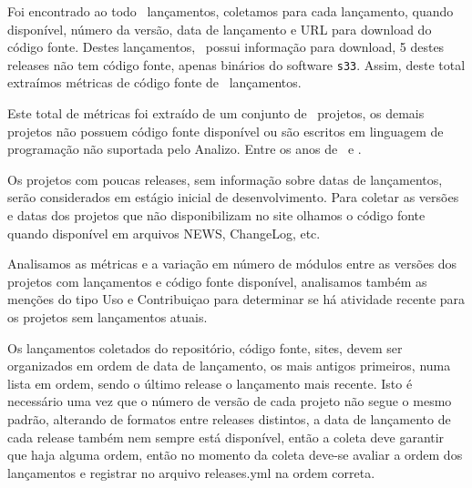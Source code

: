 Foi encontrado ao todo \ReleasesCount \ lançamentos, coletamos para cada
lançamento, quando disponível, número da versão, data de lançamento e URL para
download do código fonte. Destes lançamentos, \ReleasesAvailableCount \ possui
informação para download, 5 destes releases não tem código fonte, apenas
binários do software \texttt{s33}. Assim, deste total extraímos métricas
de código fonte de \ReleasesMetricsCount \ lançamentos.

Este total de métricas foi extraído de um conjunto de \ProjectsAnalizedCount \
projetos, os demais projetos não possuem código fonte disponível ou são
escritos em linguagem de programação não suportada pelo Analizo. Entre os anos
de \ReleasesYearFirst \ e \ReleasesYearLast.



Os projetos com poucas releases, sem informação sobre datas de lançamentos,
serão considerados em estágio inicial de desenvolvimento. Para coletar as
versões e datas dos projetos que não disponibilizam no site olhamos o código
fonte quando disponível em arquivos NEWS, ChangeLog, etc.

Analisamos as métricas e a variação em número de módulos entre as versões dos
projetos com lançamentos e código fonte disponível, analisamos também as
menções do tipo Uso e Contribuiçao para determinar se há atividade recente para
os projetos sem lançamentos atuais.





Os lançamentos coletados do repositório, código fonte, sites, devem ser organizados
em ordem de data de lançamento, os mais antigos primeiros, numa lista em ordem, sendo
o último release o lançamento mais recente. Isto é necessário uma vez que o número de versão
de cada projeto não segue o mesmo padrão, alterando de formatos entre releases distintos,
a data de lançamento de cada release também nem sempre está disponível, então
a coleta deve garantir que haja alguma ordem, então no momento da coleta deve-se
avaliar a ordem dos lançamentos e registrar no arquivo releases.yml na ordem correta.


